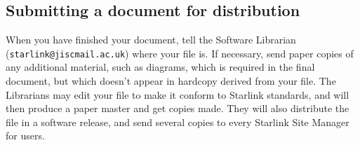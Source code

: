 \documentclass[twoside,11pt,nolof]{starlink}
\begin{document}
\subsection{Submitting a document for distribution}

When you have finished your document, tell the Software Librarian
(\texttt{starlink@jiscmail.ac.uk}) where your file is.
If necessary, send paper copies of any additional material, such as diagrams,
which is required in the final document, but which doesn't appear in hardcopy
derived from your file.
The Librarians may edit your file to make it conform to Starlink standards, and
will then produce a paper master and get copies made.
They will also distribute the file in a software release, and send several
copies to every Starlink Site Manager for users.
\end{document}
